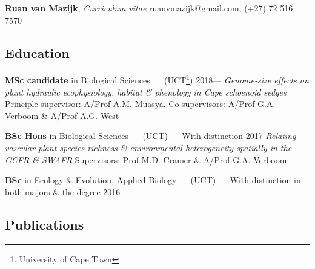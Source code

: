 \documentclass[10pt]{article}
\begin{document}
{\Large
\textbf{Ruan van Mazijk}, \textit{Curriculum vitae}
  \hfill ruanvmazijk@gmail.com, (+27) 72 516 7570
}

\hrulefill

\subsection*{Education} %

\begin{hangparas}{2em}{1}

\textbf{MSc candidate} in Biological Sciences
  ~~ (UCT\footnote{University of Cape Town})
  \hfill 2018--- \break
\textit{Genome-size effects on plant hydraulic ecophysiology, habitat \&
  phenology in Cape schoenoid sedges} \break
Principle supervisor: A/Prof A.M. Muasya. Co-supervisors: A/Prof G.A. Verboom
 \& A/Prof A.G. West

\textbf{BSc Hons} in Biological Sciences
  ~~ (UCT) ~~ With distinction
  \hfill 2017 \break
\textit{Relating vascular plant species richness \& environmental heterogeneity
  spatially in the GCFR \& SWAFR} \break
Supervisors: Prof M.D. Cramer \& A/Prof G.A. Verboom

\textbf{BSc} in Ecology \& Evolution, Applied Biology
  ~~ (UCT) ~~  With distinction in both majors \& the degree
  \hfill 2016

\hfill

\end{hangparas}

\subsection*{Publications} %
\end{document}
